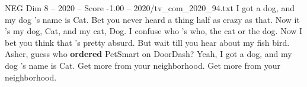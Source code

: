 \begin{textsample}{NEG Dim 8 – 2020 – Score -1.00 – 2020/tv\_com\_2020\_94.txt}  \label{ex:f8_neg_076}
I got a dog, and my dog 's name is Cat.
Bet you never heard a thing half as crazy as that.
Now it 's my dog, Cat, and my cat, Dog.
I confuse who 's who, the cat or the dog.
Now I bet you think that 's pretty absurd.
But wait till you hear about my fish bird.
Asher, guess who \textbf{ordered} PetSmart on DoorDash?
Yeah, I got a dog, and my dog 's name is Cat.
Get more from your neighborhood.
Get more from your neighborhood.

\end{textsample}

